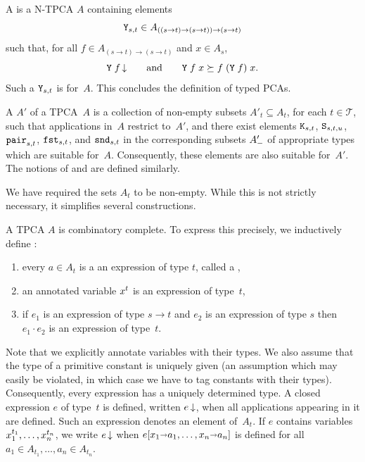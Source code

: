 A  is a
N-TPCA $A$ containing elements
%
\begin{equation*}
  \mathtt{Y}_{s,t} \in A_{((s \to t) \to (s \to t)) \to (s \to t)}
\end{equation*}
%
such that, for all $f \in A_{(s \to t) \to (s \to t)}$ and $x \in A_s$,
%
\begin{equation*}
  \mathtt{Y} \; f\,{\downarrow}
  \qquad\text{and}\qquad
  \mathtt{Y} \; f \; x \succeq f \; (\mathtt{Y}\; f) \; x.
\end{equation*}
%
Such a $\mathtt{Y}_{s,t}$ is  for~$A$. This concludes the
definition of typed PCAs.

A  $A'$ of a TPCA~$A$ is a collection of non-empty
subsets $A'_t \subseteq A_t$, for each $t \in \mathcal{T}$, such that
applications in~$A$ restrict to~$A'$, and there exist elements
$\mathtt{K}_{s,t}$, $\mathtt{S}_{s,t,u}$, $\mathtt{pair}_{s,t}$, $\mathtt{fst}_{s,t}$,
and $\mathtt{snd}_{s,t}$ in the corresponding subsets $A'_{{-}}$ of
appropriate types which are suitable for~$A$. Consequently, these
elements are also suitable for~$A'$. The notions of 
and  are defined similarly.

We have required the sets $A_t$ to be non-empty. While this is not
strictly necessary, it simplifies several constructions.

A TPCA $A$ is combinatory complete. To express this precisely, we
inductively define :
%
\begin{enumerate}
\item every $a \in A_t$ is a an expression of type $t$, called a
  ,
\item an annotated variable $x^{t}$ is an expression of type~$t$,
\item if $e_1$ is an expression of type $s \to t$ and $e_2$ is an
  expression of type $s$ then $e_1 \cdot e_2$ is an expression of
  type~$t$.
\end{enumerate}
%
Note that we explicitly annotate variables with their types. We also
assume that the type of a primitive constant is uniquely given (an
assumption which may easily be violated, in which case we have to tag
constants with their types).
Consequently, every expression has a uniquely determined type. A
closed expression $e$ of type~$t$ is defined, written $e\,{\downarrow}$,
when all applications appearing in it are defined. Such an expression
denotes an element of~$A_t$. If $e$ contains variables
$x_1^{t_1}, \ldots, x_n^{t_n}$, we write $e\,{\downarrow}$
when $e[x_1 {\shortrightarrow} a_1, \ldots, x_n {\shortrightarrow} a_n]$ is defined
for all $a_1 \in A_{t_1}, \ldots, a_n \in A_{t_n}$.

